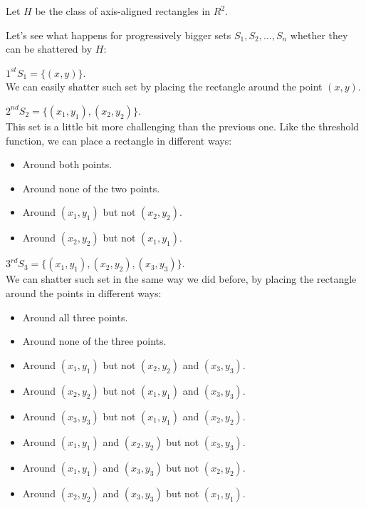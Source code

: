 \begin{example}[title = {Axis-Aligned Rectangles in $\mathbb{R}^2$}]
    Let $H$ be the class of axis-aligned rectangles in $R^2$. \vspace{7pt}

    Let's see what happens for progressively bigger sets $S_1, S_2, \dots, S_n$ whether they can be shattered by $H$: \vspace{7pt}

    $1^{st} S_1 = \{(x, y)\}$. \\
    We can easily shatter such set by placing the rectangle around the point $(x, y)$. \vspace{3.5pt}

    $2^{nd} S_2 = \{(x_1, y_1), (x_2, y_2)\}$. \\
    This set is a little bit more challenging than the previous one. Like the threshold function, we can place a rectangle in different ways:
    \begin{itemize}
        \renewcommand{\labelitemi}{-}
        \item Around both points.
        \item Around none of the two points.
        \item Around $(x_1, y_1)$ but not $(x_2, y_2)$.
        \item Around $(x_2, y_2)$ but not $(x_1, y_1)$.
    \end{itemize} \vspace{3.5pt}

    $3^{rd} S_3 = \{(x_1, y_1), (x_2, y_2), (x_3, y_3)\}$. \\
    We can shatter such set in the same way we did before, by placing the rectangle around the points in different ways:
    \begin{itemize}
        \renewcommand{\labelitemi}{-}
        \item Around all three points.
        \item Around none of the three points.
        \item Around $(x_1, y_1)$ but not $(x_2, y_2)$ and $(x_3, y_3)$.
        \item Around $(x_2, y_2)$ but not $(x_1, y_1)$ and $(x_3, y_3)$.
        \item Around $(x_3, y_3)$ but not $(x_1, y_1)$ and $(x_2, y_2)$.
        \item Around $(x_1, y_1)$ and $(x_2, y_2)$ but not $(x_3, y_3)$.
        \item Around $(x_1, y_1)$ and $(x_3, y_3)$ but not $(x_2, y_2)$.
        \item Around $(x_2, y_2)$ and $(x_3, y_3)$ but not $(x_1, y_1)$.
    \end{itemize} \vspace{3.5pt}


\end{example}
